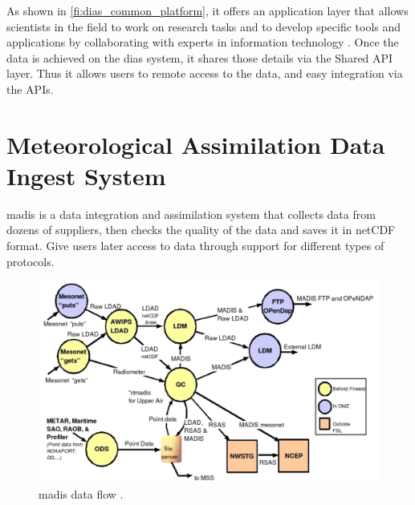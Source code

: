 As shown in \cref{fi:dias_common_platform}, it offers an application layer that allows scientists in the field to work on research tasks and to develop specific tools and applications by collaborating with experts in information technology \cite{Kawasaki2018DataReduction}. Once the data is achieved on the \acrshort{dias} system, it shares those details via the Shared API layer. Thus it allows users to remote access to the data, and easy integration via the APIs.



\section{Meteorological Assimilation Data Ingest System}
\label{se:madis}
\acrfull{madis} \cite{Macdermaid2005ArchitectureP2.39} is a data integration and assimilation system that collects data from dozens of suppliers, then checks the quality of the data and saves it in \acrshort{netCDF} format. Give users later access to data through support for different types of protocols.


\begin{figure}[htp]
    \centering
    \includegraphics[width=1\textwidth]{lit/other/madis_flow.png}
    \caption[\acrshort{madis} data flow]{\acrshort{madis} data flow \cite{Macdermaid2005ArchitectureP2.39}.}
    \label{fi:madis_flow}
\end{figure}


